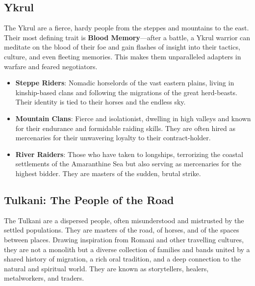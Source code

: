 \subsection*{Ykrul}

The Ykrul are a fierce, hardy people from the steppes and mountains to the east. Their most defining trait is \textbf{Blood Memory}—after a battle, a Ykrul warrior can meditate on the blood of their foe and gain flashes of insight into their tactics, culture, and even fleeting memories. This makes them unparalleled adapters in warfare and feared negotiators.

\begin{itemize}
    \item \textbf{Steppe Riders}: Nomadic horselords of the vast eastern plains, living in kinship-based clans and following the migrations of the great herd-beasts. Their identity is tied to their horses and the endless sky.
    \item \textbf{Mountain Clans}: Fierce and isolationist, dwelling in high valleys and known for their endurance and formidable raiding skills. They are often hired as mercenaries for their unwavering loyalty to their contract-holder.
    \item \textbf{River Raiders}: Those who have taken to longships, terrorizing the coastal settlements of the Amaranthine Sea but also serving as mercenaries for the highest bidder. They are masters of the sudden, brutal strike.
\end{itemize}

\subsection*{Tulkani: The People of the Road}

The Tulkani are a dispersed people, often misunderstood and mistrusted by the settled populations. They are masters of the road, of horses, and of the spaces between places. Drawing inspiration from Romani and other travelling cultures, they are not a monolith but a diverse collection of families and bands united by a shared history of migration, a rich oral tradition, and a deep connection to the natural and spiritual world. They are known as storytellers, healers, metalworkers, and traders.

